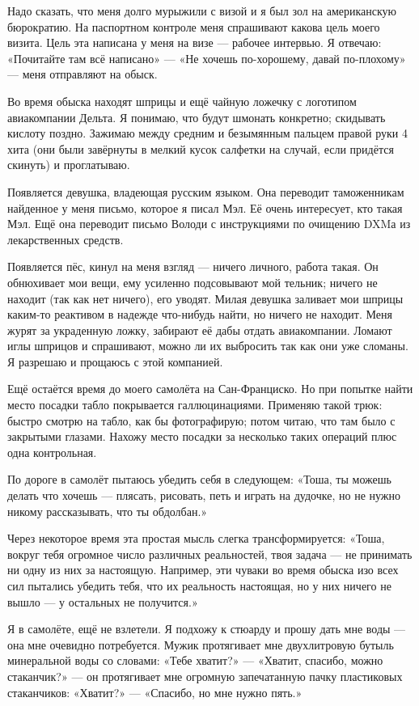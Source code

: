 \documentclass{book}
\begin{document}
Надо сказать, что меня долго мурыжили с визой и я был зол на американскую бюрократию.
На паспортном контроле меня спрашивают какова цель моего визита.
Цель эта написана у меня на визе --- рабочее интервью.
Я отвечаю: «Почитайте там всё написано» --- «Не хочешь по-хорошему, давай по-плохому» --- меня отправляют на обыск.

Во время обыска находят шприцы и ещё чайную ложечку с логотипом авиакомпании Дельта.
Я понимаю, что будут шмонать конкретно; скидывать кислоту поздно.
Зажимаю между средним и безымянным пальцем правой руки 4 хита (они были завёрнуты в мелкий кусок салфетки на случай, если придётся скинуть) и проглатываю.

Появляется девушка, владеющая русским языком.
Она переводит таможенникам найденное у меня письмо, которое я писал Мэл.
Её очень интересует, кто такая Мэл.
Ещё она переводит письмо Володи с инструкциями по очищению DXMа из лекарственных средств.

Появляется пёс, кинул на меня взгляд --- ничего личного, работа такая.
Он обнюхивает мои вещи, ему усиленно подсовывают мой тельник;
ничего не находит (так как нет ничего), его уводят.
Милая девушка заливает мои шприцы каким-то реактивом в надежде что-нибудь найти, но ничего не находит.
Меня журят за украденную ложку, забирают её дабы отдать авиакомпании.
Ломают иглы шприцов и спрашивают, можно ли их выбросить так как они уже сломаны.
Я разрешаю и прощаюсь с этой компанией.

Ещё остаётся время до моего самолёта на Сан-Франциско.
Но при попытке найти место посадки табло покрывается галлюцинациями.
Применяю такой трюк: быстро смотрю на табло, как бы фотографирую; потом читаю, что там было с закрытыми глазами.
Нахожу место посадки за несколько таких операций плюс одна контрольная.

По дороге в самолёт пытаюсь убедить себя в следующем:
«Тоша, ты можешь делать что хочешь --- плясать, рисовать, петь и играть на дудочке, но не нужно никому рассказывать, что ты обдолбан.»

Через некоторое время эта простая мысль слегка трансформируется: «Тоша, вокруг тебя огромное число различных реальностей, твоя задача --- не принимать ни одну из них за настоящую.
Например, эти чуваки во время обыска изо всех сил пытались убедить тебя, что их реальность настоящая, но у них ничего не вышло --- у остальных не получится.»

Я в самолёте, ещё не взлетели.
Я подхожу к стюарду и прошу дать мне воды --- она мне очевидно потребуется.
Мужик протягивает мне двухлитровую бутыль минеральной воды со словами: «Тебе хватит?» --- «Хватит, спасибо, можно стаканчик?» --- он протягивает мне огромную запечатанную пачку пластиковых стаканчиков: «Хватит?» --- «Спасибо, но мне нужно пять.»
\end{document}
